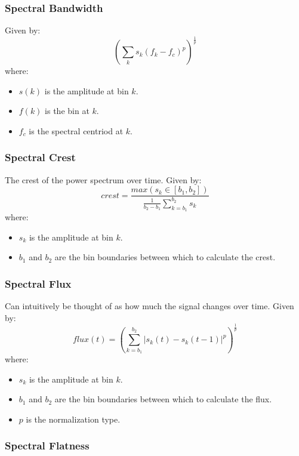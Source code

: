 \documentclass[a4paper, 12pt, twoside]{report}
\begin{document}
\subsubsection{Spectral Bandwidth }
\label{sec:org9dcacf6}

    Given by:
    \[ (\sum_{k}s_{k}(f_{k} - f_{c})^{p})^{\frac{1}{p}}\]
    where:
    \begin{itemize}
      \item $s( k )$ is the amplitude at bin $k$.
      \item $f( k )$ is the bin at $k$.
      \item $f_{c}$ is the spectral centriod at $k$.
    \end{itemize}

\subsubsection{Spectral Crest}
\label{sec:org25d762a}

    The crest of the power spectrum over time. Given by:
        \[ crest = \frac{max(s_{k}\in[b_{1}, b_{2}])}{\frac{1}{b_{2} - b_{1}}\sum^{b_{2}}_{k=b_{1}}s_{k}} \]
    where:
    \begin{itemize}
      \item $s_{k}$ is the amplitude at bin $k$.
      \item $b_{1}$ and $b_{2}$ are the bin boundaries between which to calculate the crest.
    \end{itemize}
\subsubsection{Spectral Flux}
\label{sec:org8d3ce71}

    Can intuitively be thought of as how much the signal changes over time. Given by:
        \[ flux(t) = (\sum^{b_{2}}_{k=b_{1}}|s_{k}(t)-s_{k}(t-1)|^{p})^{\frac{1}{p}} \]
    where:
    \begin{itemize}
      \item $s_{k}$ is the amplitude at bin $k$.
      \item $b_{1}$ and $b_{2}$ are the bin boundaries between which to calculate the flux.
      \item $p$ is the normalization type.
    \end{itemize}

\subsubsection{Spectral Flatness}
\label{sec:org06c8a6d}
\end{document}
